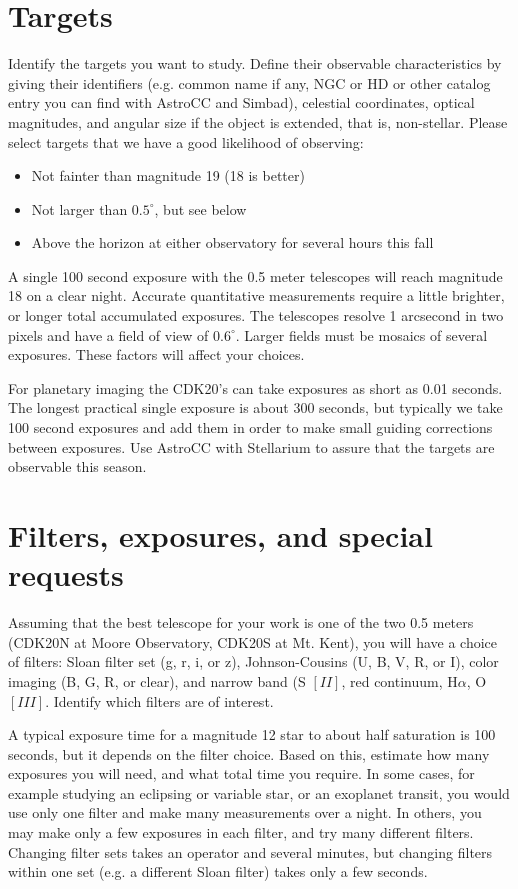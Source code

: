\documentclass[dvips,12pt]{article}
\begin{document}
\section{Targets}

Identify the targets you want to study.  Define their observable characteristics
by giving their identifiers (e.g. common name if any, NGC or HD or other catalog
entry you can find with AstroCC and Simbad), celestial coordinates, optical
magnitudes, and angular size if the object is extended, that is, non-stellar.
Please select targets that we have a good likelihood of observing:
\begin{itemize}
\item Not fainter than magnitude 19 (18 is better)
\item Not larger than $0.5^\circ$, but see below
\item Above the horizon at either observatory for several hours this fall
\end{itemize}

A single 100 second exposure with the 0.5 meter telescopes will reach magnitude
18 on a clear night.  Accurate quantitative measurements require a little
brighter, or longer total accumulated exposures.  The telescopes resolve 1
arcsecond in two pixels and have a field of view of $0.6^\circ$.  Larger fields
must be mosaics of several exposures. These factors will affect your
choices.  

For planetary imaging the CDK20's can take exposures as short as 0.01 seconds. 
The longest practical single exposure is about 300 seconds, but typically we
take 100 second exposures and add them in order to make small guiding
corrections between exposures. Use AstroCC with Stellarium to assure that the
targets are observable this season.

\section{Filters, exposures, and special requests}

Assuming that the best telescope for your work is one of the two 0.5 meters
(CDK20N at Moore Observatory, CDK20S at Mt. Kent), you will have a choice of
filters:  Sloan filter set (g, r, i, or z),  Johnson-Cousins (U, B, V, R, or I),
color imaging (B, G, R, or clear), and narrow band (S $[II]$, red continuum,
H$\alpha$,  O$[III]$.  Identify which filters are of interest.

A typical exposure time for a magnitude 12 star to about half saturation is 100
seconds, but it depends on the filter choice.  Based on this, estimate how many
exposures you will need, and what total time you require.  In some cases, for
example studying an eclipsing or variable star, or an exoplanet transit, you
would use only one filter and make many measurements over a night.  In others,
you may make only a few exposures in each filter, and try many different
filters.   Changing filter sets takes an operator and several minutes, but
changing filters within one set (e.g. a different Sloan filter) takes only a few
seconds.
\end{document}

